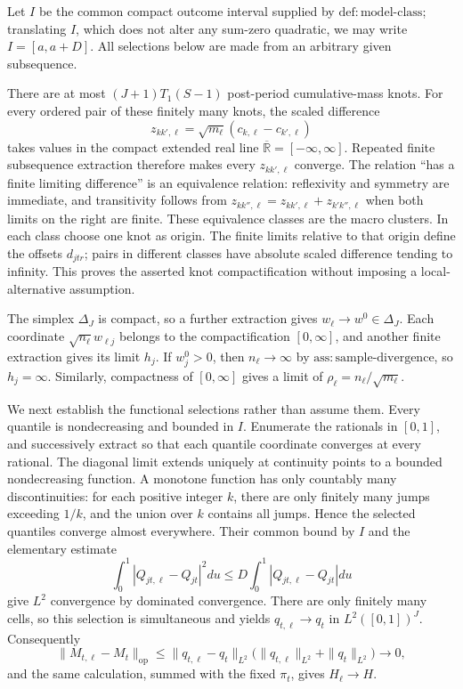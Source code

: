 Let \(I\) be the common compact outcome interval supplied by \(\mathrm{def:model\mbox{-}class}\); translating \(I\), which does not alter any sum-zero quadratic, we may write \(I=[a,a+D]\).  All selections below are made from an arbitrary given subsequence.

There are at most \((J+1)T_1(S-1)\) post-period cumulative-mass knots.  For every ordered pair of these finitely many knots, the scaled difference
\[
 z_{kk',\ell}=\sqrt{m_\ell}(c_{k,\ell}-c_{k',\ell})
\]
takes values in the compact extended real line \(\overline{\mathbb R}=[-\infty,\infty]\).  Repeated finite subsequence extraction therefore makes every \(z_{kk',\ell}\) converge.  The relation ``has a finite limiting difference'' is an equivalence relation: reflexivity and symmetry are immediate, and transitivity follows from
\(z_{kk'',\ell}=z_{kk',\ell}+z_{k'k'',\ell}\) when both limits on the right are finite.  These equivalence classes are the macro clusters.  In each class choose one knot as origin.  The finite limits relative to that origin define the offsets \(d_{jtr}\); pairs in different classes have absolute scaled difference tending to infinity.  This proves the asserted knot compactification without imposing a local-alternative assumption.

The simplex \(\Delta_J\) is compact, so a further extraction gives \(w_\ell\to w^0\in\Delta_J\).  Each coordinate \(\sqrt{n_\ell}w_{\ell j}\) belongs to the compactification \([0,\infty]\), and another finite extraction gives its limit \(h_j\).  If \(w_j^0>0\), then \(n_\ell\to\infty\) by \(\mathrm{ass:sample\mbox{-}divergence}\), so \(h_j=\infty\).  Similarly, compactness of \([0,\infty]\) gives a limit of \(\rho_\ell=n_\ell/\sqrt{m_\ell}\).

We next establish the functional selections rather than assume them.  Every quantile is nondecreasing and bounded in \(I\).  Enumerate the rationals in \([0,1]\), and successively extract so that each quantile coordinate converges at every rational.  The diagonal limit extends uniquely at continuity points to a bounded nondecreasing function.  A monotone function has only countably many discontinuities: for each positive integer \(k\), there are only finitely many jumps exceeding \(1/k\), and the union over \(k\) contains all jumps.  Hence the selected quantiles converge almost everywhere.  Their common bound by \(I\) and the elementary estimate
\[
 \int_0^1|Q_{jt,\ell}-Q_{jt}|^2du
 \leq D\int_0^1|Q_{jt,\ell}-Q_{jt}|du
\]
give \(L^2\) convergence by dominated convergence.  There are only finitely many cells, so this selection is simultaneous and yields \(q_{t,\ell}\to q_t\) in \(L^2([0,1])^J\).  Consequently
\[
 \|M_{t,\ell}-M_t\|_{\mathrm{op}}
 \leq \|q_{t,\ell}-q_t\|_{L^2}
       \bigl(\|q_{t,\ell}\|_{L^2}+\|q_t\|_{L^2}\bigr)
 \longrightarrow0,
\]
and the same calculation, summed with the fixed \(\pi_t\), gives \(H_\ell\to H\).

